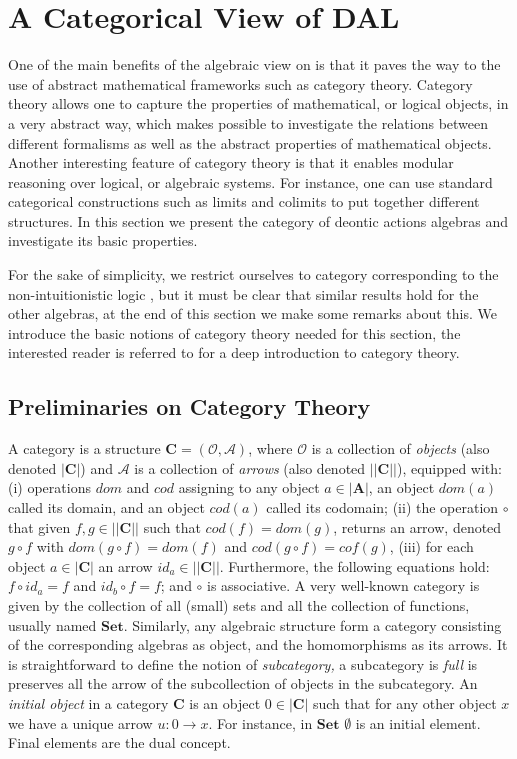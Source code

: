 \section{A Categorical View of DAL}\label{sec:cat}

One of the main benefits of the algebraic view on \DAL is that it paves the way to the use of abstract mathematical  frameworks such as category theory.  Category theory allows one to capture the properties of mathematical, or logical objects, in a very abstract way,  which makes possible to investigate the relations between different formalisms as well as the abstract properties of mathematical objects.  Another interesting feature of category theory is that it enables modular reasoning over logical, or algebraic systems. For instance,  one can use  standard categorical constructions such as limits and colimits  to put together different structures.  In this section we present the category of deontic actions algebras and investigate its basic properties.

For the sake of simplicity, we restrict ourselves to  category corresponding to the non-intuitionistic logic \DAL, but it must be clear that similar results hold for the other algebras, at the end of this section we make some remarks about this.  We introduce the basic notions of category theory needed for this section,  the interested reader is referred to \cite{MacLane98} for a deep introduction to category theory.

\subsection{Preliminaries on Category Theory}
A category is a structure $\mathbf{C} = (\mathcal{O}, \mathcal{A})$, where $\mathcal{O}$ is a collection of \emph{objects} (also denoted $|\mathbf{C}|$) and $\mathcal{A}$ is a collection of \emph{arrows} (also denoted $||\mathbf{C}||$), equipped with: (i) operations $\mathit{dom}$ and $\mathit{cod}$ assigning to any object $a \in |\mathbf{A}|$, an object $\mathit{dom}(a)$ called its domain, and an object $\mathit{cod}(a)$ called its codomain; (ii) the operation $\circ$ that given $f,g \in ||\mathbf{C}||$ such that $\mathit{cod}(f) = \mathit{dom}(g)$,  returns an arrow, denoted $g \circ f$ with $\mathit{dom}(g \circ f) = dom(f)$ and
$\mathit{cod}(g \circ f) = cof(g)$, (iii) for each object $a \in |\mathbf{C}|$ an arrow $id_a \in || \mathbf{C}||$. Furthermore, the following equations hold: $f \circ id_a = f$ and $id_b \circ f = f$; and  $\circ$ is associative.
A very well-known category is given by  the collection of all (small) sets and all the collection of functions, usually named $\mathbf{Set}$. Similarly,  any algebraic structure form a category consisting of the corresponding algebras as object, and the homomorphisms as its arrows.  It is straightforward to define the notion of \emph{subcategory, } a subcategory is \emph{full} is preserves all the arrow of the subcollection of objects in the subcategory.   An \emph{initial object} in a category $\mathbf{C}$ is an object $0 \in |\mathbf{C}|$ such that for any other object $x$ we have a unique arrow $u : 0 \rightarrow x$. For instance, in $\mathbf{Set}$ $\emptyset$ is an initial element. Final elements are the dual concept.  

